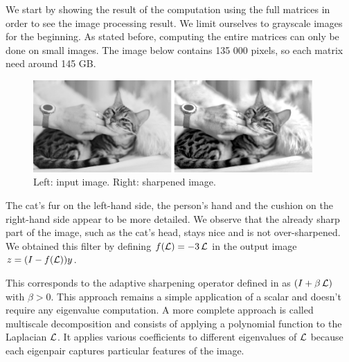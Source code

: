 We start by showing the result of the computation using the full matrices in order to see the image processing result.
We limit ourselves to grayscale images for the beginning.
As stated before, computing the entire matrices can only be done on small images.
The image below contains 135 000 pixels, so each matrix need around 145 GB.

\begin{figure}[H]
  \centering
  \includegraphics[width=0.95\textwidth]{img/cat.png}
  \caption{Left: input image. Right: sharpened image.}
\end{figure}

The cat's fur on the left-hand side, the person's hand and the cushion on the right-hand side appear to be more detailed.
We observe that the already sharp part of the image, such as the cat's head, stays nice and is not over-sharpened.
We obtained this filter by defining \(f(\operatorname{\mathcal{L}}) = -3\operatorname{\mathcal{L}}\) in the output image \(z = (I - f(\operatorname{\mathcal{L}}))y\).

This corresponds to the adaptive sharpening operator defined in \cite{siam_slides_2016} as \((I + \beta \operatorname{\mathcal{L}})\) with \(\beta > 0\).
This approach remains a simple application of a scalar and doesn't require any eigenvalue computation.
A more complete approach is called multiscale decomposition \cite{talebi_nonlocal_2014} and consists of applying a polynomial function to the Laplacian \(\operatorname{\mathcal{L}}\).
It applies various coefficients to different eigenvalues of \(\operatorname{\mathcal{L}}\) because each eigenpair captures particular features of the image.
